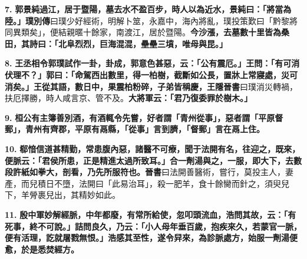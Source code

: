 \textbf{7.} \textbf{郭景純過江，居于暨陽，墓去水不盈百步，時人以為近水，景純曰：「將當為陸。」}{\footnotesize \textbf{璞別傳}曰璞少好經術，明解卜筮，永嘉中，海內將亂，璞投策歎曰「黔黎將同異類矣」，便結親暱十餘家，南渡江，居於暨陽。}\textbf{今沙漲，去墓數十里皆為桑田，其詩曰：「北阜烈烈，巨海混混，壘壘三墳，唯母與昆。」}

\textbf{8.} \textbf{王丞相令郭璞試作一卦，卦成，郭意色甚惡，云：「公有震厄。」王問：「有可消伏理不？」郭曰：「命駕西出數里，得一柏樹，截斷如公長，置牀上常寢處，災可消矣。」王從其語，數日中，果震柏粉碎，子弟皆稱慶，}{\footnotesize \textbf{王隱晉書}曰璞消災轉禍，扶厄擇勝，時人咸言京、管不及。}\textbf{大將軍云：「君乃復委罪於樹木。」}

\textbf{9.} \textbf{桓公有主簿善別酒，有酒輒令先嘗，好者謂「青州從事」，惡者謂「平原督郵」，青州有齊郡，平原有鬲縣，「從事」言到臍，「督郵」言在鬲上住。}

\textbf{10.} \textbf{郗愔信道甚精勤，常患腹內惡，諸醫不可療，聞于法開有名，往迎之，既來，便脈云：「君侯所患，正是精進太過所致耳。」合一劑湯與之，一服，即大下，去數段許紙如拳大，剖看，乃先所服符也。}{\footnotesize \textbf{晉書}曰法開善醫術，嘗行，莫投主人，妻產，而兒積日不墮，法開曰「此易治耳」，殺一肥羊，食十餘臠而針之，須臾兒下，羊膋裹兒出，其精妙如此。}

\textbf{11.} \textbf{殷中軍妙解經脈，中年都廢，有常所給使，忽叩頭流血，浩問其故，云：「有死事，終不可說。」詰問良久，乃云：「小人母年垂百歲，抱疾來久，若蒙官一脈，便有活理，訖就屠戮無恨。」浩感其至性，遂令舁來，為診脈處方，始服一劑湯便愈，於是悉焚經方。}